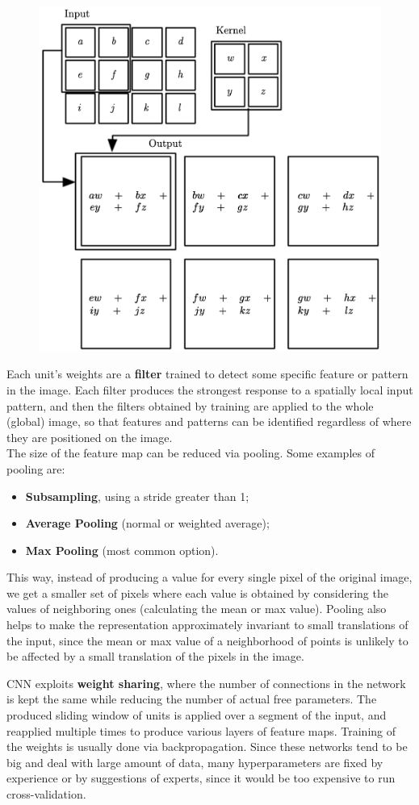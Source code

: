 \begin{figure}[ht]
    \centering
    \includegraphics[width=0.5\linewidth]{img/CNN_matrix.png}
\end{figure}
Each unit's weights are a \textbf{filter} trained to detect some specific feature or pattern in the image. Each filter produces the strongest response to a spatially local input pattern, and then the filters obtained by training are applied to the whole (global) image, so that features and patterns can be identified regardless of where they are positioned on the image. \\
The size of the feature map can be reduced via pooling. Some examples of pooling are:
\begin{itemize}
    \item \textbf{Subsampling}, using a stride greater than 1;
    \item \textbf{Average Pooling} (normal or weighted average);
    \item \textbf{Max Pooling} (most common option).
\end{itemize}
This way, instead of producing a value for every single pixel of the original image, we get a smaller set of pixels where each value is obtained by considering the values of neighboring ones (calculating the mean or max value). Pooling also helps to make the representation approximately invariant to small translations of the input, since the mean or max value of a neighborhood of points is unlikely to be affected by a small translation of the pixels in the image.

CNN exploits \textbf{weight sharing}, where the number of connections in the network is kept the same while reducing the number of actual free parameters. The produced sliding window of units is applied over a segment of the input, and reapplied multiple times to produce various layers of feature maps. Training of the weights is usually done via backpropagation. Since these networks tend to be big and deal with large amount of data, many hyperparameters are fixed by experience or by suggestions of experts, since it would be too expensive to run cross-validation.

